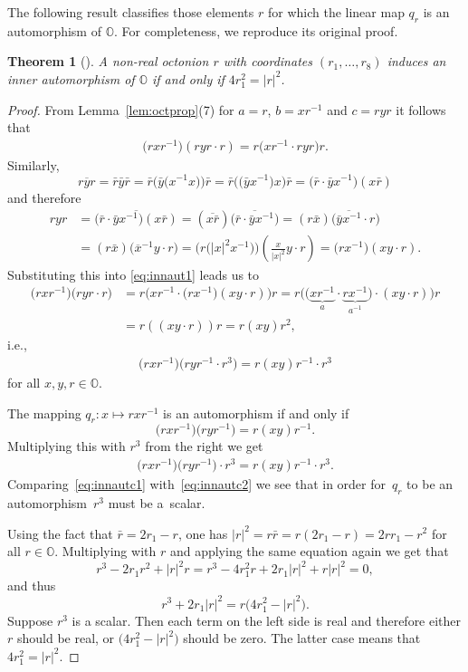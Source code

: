 \documentclass[10pt,a4paper]{amsart}
\numberwithin{equation}{section}
\newtheorem{Theorem}{Theorem}[section]
\newcommand{\SO}{\mathbb{O}} %
\begin{document}
The following result classifies those elements $r$ for which the linear map $q_r$ is an automorphism of $\SO$. For completeness, we reproduce its original proof.
\begin{Theorem}[\cite{lamont1963arithmetics}] \label{thm:reoctin}
 A non-real octonion $r$ with coordinates $(r_1,\dots,r_8)$ induces an inner automorphism of $\SO$ if and only if $4r_1^2=|r|^2$.
\end{Theorem}
\begin{proof} From Lemma~\ref{lem:octprop}(7) for $a=r$, $b=xr^{-1}$ and $c=ryr$ it follows that
 \begin{gather} \big(rxr^{-1}\big)(ryr \cdot r)=r\big(xr^{-1} \cdot ryr \big)r. \label{eq:innaut1}\end{gather}
 Similarly,
 \[\overline{ryr}=\bar{r}\bar{y}\bar{r}=\bar{r}\big(\bar{y} \big(x^{-1}x\big)\big)\bar{r}=\bar{r}\big(\big(\bar{y} x^{-1}\big)x\big)\bar{r}=\big(\bar{r} \cdot \bar{y}x^{-1}\big)(x\bar{r})\]
 and therefore
 \begin{align*}
 ryr &= \overline{\big(\bar{r} \cdot \bar{y}x^{-1}\big)(x\bar{r})}=(\overline{x\bar{r}}) \big(\overline{\bar{r}\cdot \bar{y}x^{-1}}\big)=(r\bar{x})\big(\overline{\bar{y}x^{-1}} \cdot r\big) \\
 &=(r\bar{x}) \big(\overline{x}^{-1}y\cdot r\big)= \big(r \big(|x|^2 x^{-1}\big) \big) \left(\frac{x}{|x|^2}y\cdot r\right)=\big(r x^{-1} \big) (xy\cdot r).
 \end{align*}
 Substituting this into \eqref{eq:innaut1} leads us to
 \begin{align*}
 \big(rxr^{-1}\big)\big(ryr \cdot r\big)&=r\big(xr^{-1} \cdot \big(r x^{-1} \big) (xy\cdot r) \big)r =r\big( \big(\underbrace{xr^{-1}}_a \cdot \underbrace{r x^{-1}}_{a^{-1}} \big) \cdot (xy\cdot r) \big)r\\
 &=r((xy\cdot r) )r= r(xy)r^2,
 \end{align*}
 i.e.,
 \begin{gather} \big(rxr^{-1}\big)\big(ryr^{-1} \cdot r^3\big)=r(xy)r^{-1}\cdot r^3 \label{eq:innautc1}\end{gather}
 for all $x,y,r\in\SO$.

 The mapping $q_r\colon x\mapsto rxr^{-1}$ is an automorphism if and only if
 \[ \big(rxr^{-1}\big)\big(ryr^{-1}\big)=r(xy)r^{-1}.\]
 Multiplying this with $r^3$ from the right we get
 \begin{gather} \big(rxr^{-1}\big)\big(ryr^{-1}\big) \cdot r^3=r(xy)r^{-1}\cdot r^3. \label{eq:innautc2}\end{gather}
 Comparing~\eqref{eq:innautc1} with~\eqref{eq:innautc2} we see that in order for~$q_r$ to be an automorphism~$r^{3}$ must be a~scalar.

 Using the fact that $\bar{r}=2r_1-r$, one has $|r|^2=r\bar{r}=r(2r_1-r)=2rr_1-r^2$ for all $r \in \SO$. Multiplying with $r$ and applying the same equation again we get that
 \[ r^3-2r_1r^2+|r|^2r=r^3-4r_1^2 r+2r_1|r|^2+r|r|^2=0, \]
 and thus
 \[ r^3+2r_1|r|^2=r\big(4r_1^2 -|r|^2\big). \]
 Suppose $r^{3}$ is a scalar. Then each term on the left side is real and therefore either $r$ should be real, or $\big(4r_1^2 -|r|^2\big)$ should be zero. The latter case means that $4r_1^2 =|r|^2$.
\end{proof}
\end{document}
